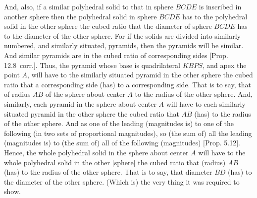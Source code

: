 \begin{Parallel}{}{}
{And, also, if a similar polyhedral solid  to that in sphere $BCDE$ is inscribed in another sphere then the polyhedral solid in sphere $BCDE$ has
to the polyhedral solid in the other sphere the cubed ratio that the diameter of sphere $BCDE$ has to the diameter of the other
sphere. For if the solids are divided into similarly numbered, and similarly situated, pyramids, then the pyramids will be
similar. And similar pyramids are in the cubed ratio of corresponding sides [Prop. 12.8~corr.]. 
Thus, the pyramid whose base is quadrilateral $KBPS$, and apex the point $A$, will have to the similarly situated pyramid in the other
sphere the cubed ratio that a corresponding side (has) to a corresponding side. That is to say, that of radius $AB$ of the
sphere about center $A$ to the radius of the other sphere. And, similarly, each pyramid in the sphere about center $A$ will have to
each similarly situated pyramid in the other sphere the cubed ratio that $AB$ (has) to the radius of the other sphere. And as
one of the leading (magnitudes is) to one of the following (in two sets of proportional magnitudes), so (the sum of) all the
leading (magnitudes is) to (the sum of) all of the following (magnitudes)  [Prop. 5.12]. 
Hence, the whole polyhedral solid in the sphere about center $A$ will have to the whole polyhedral solid in the other [sphere] the
cubed ratio that (radius) $AB$ (has) to the radius of the other sphere. That is to say, that diameter $BD$ (has) to the diameter of the
other sphere. (Which is) the very thing it was required to show.}
\end{Parallel}

